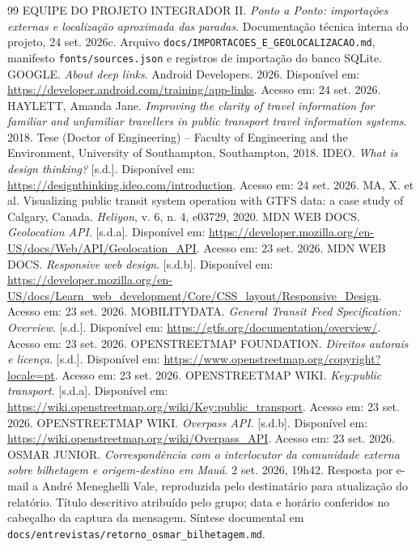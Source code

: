 \documentclass[12pt,oneside,a4paper,brazil]{abntex2}
\begin{document}
\begin{thebibliography}{99}
 EQUIPE DO PROJETO INTEGRADOR II. \textit{Ponto a Ponto: importações externas e localização aproximada das paradas}. Documentação técnica interna do projeto, 24 set. 2026c. Arquivo \texttt{docs/IMPORTACOES\_E\_GEOLOCALIZACAO.md}, manifesto \texttt{fonts/sources.json} e registros de importação do banco SQLite.
 GOOGLE. \textit{About deep links}. Android Developers. 2026. Disponível em: \url{https://developer.android.com/training/app-links}. Acesso em: 24 set. 2026.
 HAYLETT, Amanda Jane. \textit{Improving the clarity of travel information for familiar and unfamiliar travellers in public transport travel information systems}. 2018. Tese (Doctor of Engineering) -- Faculty of Engineering and the Environment, University of Southampton, Southampton, 2018.
 IDEO. \textit{What is design thinking?} [s.d.]. Disponível em: \url{https://designthinking.ideo.com/introduction}. Acesso em: 24 set. 2026.
 MA, X. et al. Visualizing public transit system operation with GTFS data: a case study of Calgary, Canada. \textit{Heliyon}, v. 6, n. 4, e03729, 2020.
 MDN WEB DOCS. \textit{Geolocation API}. [s.d.a]. Disponível em: \url{https://developer.mozilla.org/en-US/docs/Web/API/Geolocation_API}. Acesso em: 23 set. 2026.
 MDN WEB DOCS. \textit{Responsive web design}. [s.d.b]. Disponível em: \url{https://developer.mozilla.org/en-US/docs/Learn_web_development/Core/CSS_layout/Responsive_Design}. Acesso em: 23 set. 2026.
 MOBILITYDATA. \textit{General Transit Feed Specification: Overview}. [s.d.]. Disponível em: \url{https://gtfs.org/documentation/overview/}. Acesso em: 23 set. 2026.
 OPENSTREETMAP FOUNDATION. \textit{Direitos autorais e licença}. [s.d.]. Disponível em: \url{https://www.openstreetmap.org/copyright?locale=pt}. Acesso em: 23 set. 2026.
 OPENSTREETMAP WIKI. \textit{Key:public transport}. [s.d.a]. Disponível em: \url{https://wiki.openstreetmap.org/wiki/Key:public_transport}. Acesso em: 23 set. 2026.
 OPENSTREETMAP WIKI. \textit{Overpass API}. [s.d.b]. Disponível em: \url{https://wiki.openstreetmap.org/wiki/Overpass_API}. Acesso em: 23 set. 2026.
 OSMAR JUNIOR. \textit{Correspondência com o interlocutor da comunidade externa sobre bilhetagem e origem-destino em Mauá}. 2 set. 2026, 19h42. Resposta por e-mail a André Meneghelli Vale, reproduzida pelo destinatário para atualização do relatório. Título descritivo atribuído pelo grupo; data e horário conferidos no cabeçalho da captura da mensagem. Síntese documental em \texttt{docs/entrevistas/retorno\_osmar\_bilhetagem.md}.

\end{thebibliography}
\end{document}
